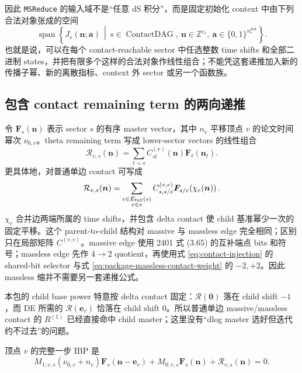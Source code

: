 \documentclass[11pt,a4paper]{ctexart}
\newcommand{\cR}{\mathcal R}
\begin{document}
因此 \texttt{MSReduce} 的输入域不是“任意 dS 积分”，而是固定初始化 context 中由下列合法对象张成的空间
\begin{equation}
 \boxed{
 \operatorname{span}\!\left\{
 J_s(\bm n;\bm a)\,\middle|\,
 s\in\operatorname{ContactDAG},\
 \bm n\in\mathbb Z^{c_s},\
 \bm a\in\{0,1\}^{n_s^{\mathrm{slot}}}
 \right\}.
 }
 \label{eq:MSReduce-domain}
\end{equation}
也就是说，可以在每个 contact-reachable sector 中任选整数 time shifts 和全部二进制 states，并把有限多个这样的合法对象作线性组合；不能凭这套递推加入新的传播子幂、新的离散指标、context 外 sector 或另一个函数族。

\subsection{包含 contact remaining term 的两向递推}

令 $\bm F_s(\bm n)$ 表示 sector $s$ 的有序 master vector，其中 $n_v$ 平移顶点 $v$ 的论文时间幂次 $\nu_{0,v}$。theta remaining term 写成 lower-sector vectors 的线性组合
\begin{equation}
 \cR_{v,s}(\bm n)
 =\sum_{t\prec s}C_{st}^{(v)}(\bm n)\bm F_t(\bm n_t).
 \label{eq:R-as-CF}
\end{equation}
更具体地，对普通单边 contact 可写成
\begin{equation}
 \cR_{v,s}(\bm n)
 =\sum_{\substack{e\in E_{\rm full}(s)\\v\in e}}
 C_{s,s/e}^{(v,e)}
 \bm F_{s/e}\!\left(\chi_e(\bm n)\right).
 \label{eq:R-edge-sum}
\end{equation}
$\chi_e$ 合并边两端所属的 time shifts，并包含 delta contact 使 child 基准幂少一次的固定平移。这个 parent-to-child 结构对 massive 与 massless edge 完全相同；区别只在局部矩阵 $C^{(v,e)}$。massive edge 使用 2401 式 (3.65) 的互补端点 bits 和符号；massless edge 先作 $4\to2$ quotient，再使用式 \eqref{eq:contact-injection} 的 shared-bit selector 与式 \eqref{eq:package-massless-contact-weight} 的 $-2,+2$。因此 massless 缩并不需要另一套递推公式。

本包的 child base power 特意按 delta contact 固定：$\cR(\bm0)$ 落在 child shift $-1$，而 DE 所需的 $\cR(\bm e_v)$ 恰落在 child shift $0$。所以普通单边 massive/massless contact 的 $R^{(1)}$ 已经直接命中 child master；这里没有“dlog master 选好但迭代约不过去”的问题。

顶点 $v$ 的完整一步 IBP 是
\begin{equation}
 M_{1;v,s}(\nu_{0,v}+n_v)\bm F_s(\bm n-\bm e_v)
 +M_{0;v,s}\bm F_s(\bm n)
 +\cR_{v,s}(\bm n)=0.
 \label{eq:global-one-step-ibp}
\end{equation}
\end{document}
